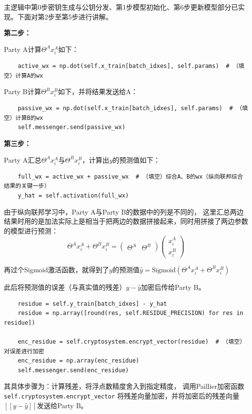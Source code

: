 \documentclass[twoside,11pt]{article}
\begin{document}
主逻辑中第0步密钥生成与公钥分发、第1步模型初始化、第6步更新模型部分已实现。下面对第2步至第5步进行讲解。

\textbf{第二步：}

Party A计算$\Theta^A x_i^A$如下：
\begin{lstlisting}
    active_wx = np.dot(self.x_train[batch_idxes], self.params)  # （填空）计算A的wx
\end{lstlisting}

Party B计算$\Theta^B x_i^B$如下，并将结果发送给A：
\begin{lstlisting}
    passive_wx = np.dot(self.x_train[batch_idxes], self.params)  # （填空）计算B的wx
    self.messenger.send(passive_wx)
\end{lstlisting}

\textbf{第三步：}

Party A汇总$\Theta^A x_i^A$与$\Theta^B x_i^B$，计算出$y$的预测值如下：
\begin{lstlisting}
    full_wx = active_wx + passive_wx  # （填空）综合A、B的wx（纵向联邦综合结果的关键一步）
    y_hat = self.activation(full_wx)
\end{lstlisting}

由于纵向联邦学习中，Party A与Party B的数据中的列是不同的，
这里汇总两边结果时用的是加法实际上是相当于把两边的数据拼接起来，同时用拼接了两边参数的模型进行预测：
$$
    \Theta^A x_i^A + \Theta^B x_i^B =
    \begin{pmatrix}
        \Theta^A & \Theta^B
    \end{pmatrix}
    \begin{pmatrix}
        x_i^A \\
        x_i^B
    \end{pmatrix}
$$

再过个Sigmoid激活函数，就得到了$y$的预测值$\hat{y}=\mathrm{Sigmoid}(\Theta^A x_i^A + \Theta^B x_i^B)$

此后将预测值的误差（与真实值的残差）$y-\hat{y}$加密后传给Party B。
\begin{lstlisting}
    residue = self.y_train[batch_idxes] - y_hat
    residue = np.array([round(res, self.RESIDUE_PRECISION) for res in residue])

    enc_residue = self.cryptosystem.encrypt_vector(residue)  # （填空）对误差进行加密
    enc_residue = np.array(enc_residue)
    self.messenger.send(enc_residue)
\end{lstlisting}

其具体步骤为：计算残差，将浮点数精度舍入到指定精度，
调用Paillier加密函数 \\ \verb|self.cryptosystem.encrypt_vector| 将残差向量加密，并将加密后的残差向量$[[y-\hat{y}]]$发送给Party B。
\end{document}
